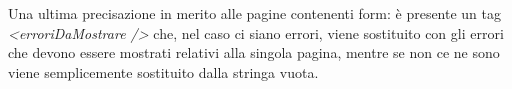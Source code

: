 \bigskip
\bigskip

Una ultima precisazione in merito alle pagine contenenti form: è presente un tag \textit{<erroriDaMostrare />} che, nel caso ci siano errori, viene sostituito con gli errori che devono essere mostrati  relativi alla singola pagina, mentre se non ce ne sono viene semplicemente sostituito dalla stringa vuota.







